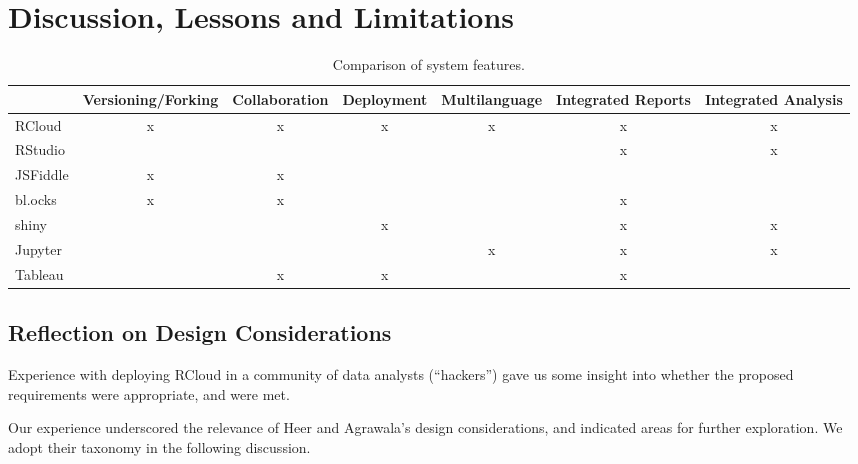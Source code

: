\section{Discussion, Lessons and Limitations}
\label{sec:discussion}

\begin{table*}
  \centering
  \begin{tabular}{l|cccccc}
           & Versioning/Forking & Collaboration & Deployment & Multilanguage & Integrated Reports & Integrated Analysis \\
    \hline
RCloud     &       x            &       x       &     x      &      x        &           x        &           x         \\
RStudio    &                    &               &            &               &           x        &           x         \\
JSFiddle   &       x            &       x       &            &               &                    &                     \\
bl.ocks    &       x            &       x       &            &               &           x        &                     \\
shiny      &                    &               &     x      &               &           x        &           x         \\
Jupyter    &                    &               &            &      x        &           x        &           x         \\
Tableau    &                     &      x        &    x       &               &          x         &                     
  \end{tabular}
  \caption{Comparison of system features.}
\end{table*}

\subsection{Reflection on Design Considerations}

Experience with deploying RCloud in a community of data analysts
(``hackers'') gave us some insight into whether the proposed
requirements were appropriate, and were met.

Our experience underscored the relevance of Heer and Agrawala's design
considerations, and indicated areas for further exploration. We adopt
their taxonomy in the following discussion.

